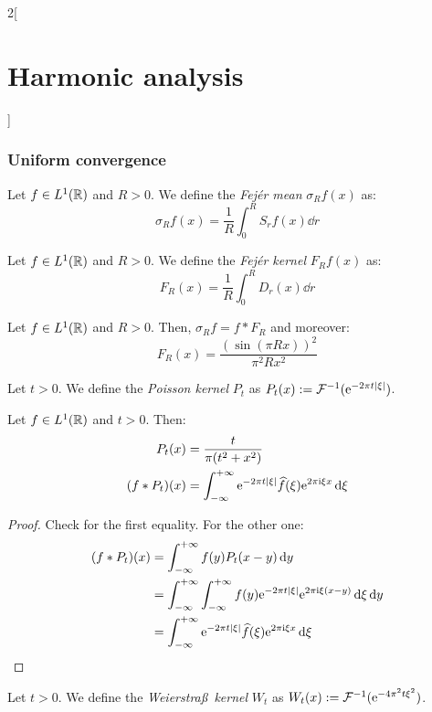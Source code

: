 \documentclass[../../../main_math.tex]{subfiles}
\begin{document}
\begin{multicols}{2}[\section{Harmonic analysis}]
  \subsubsection{Uniform convergence}
  \begin{definition}
    Let $f\in L^1(\mathbb{R})$ and $R>0$. We define the \emph{Fejér mean} $\sigma_Rf(x)$ as: $$\sigma_Rf(x)=\frac{1}{R}\int_{0}^RS_rf(x)\dd{r}$$
  \end{definition}
  \begin{definition}
    Let $f\in L^1(\mathbb{R})$ and $R>0$. We define the \emph{Fejér kernel} $F_Rf(x)$ as: $$F_R(x)=\frac{1}{R}\int_{0}^RD_r(x)\dd{r}$$
  \end{definition}
  \begin{lemma}
    Let $f\in L^1(\mathbb{R})$ and $R>0$. Then, $\sigma_Rf=f*F_R$ and moreover:
    $$F_R(x)=\frac{{\left(\sin\left(\pi R x\right)\right)}^2}{\pi^2 R x^2}$$
  \end{lemma}
  \begin{definition}
    Let $t>0$. We define the \emph{Poisson kernel} $P_t$ as $P_t(x):=\mathcal{F}^{-1}(\mathrm{e}^{-2\pi t\abs{\xi}})$.
  \end{definition}
  \begin{lemma}
    Let $f\in L^1(\mathbb{R})$ and $t>0$. Then:
    \begin{align*}
      P_t(x)     & =\frac{t}{\pi(t^2+x^2)}                                                                   \\
      (f*P_t)(x) & =\int_{-\infty}^{+\infty}\mathrm{e}^{-2\pi t\abs{\xi}}\widehat{f}(\xi)\mathrm{e}^{2\pi\mathrm{i}\xi x}\dd{\xi}
    \end{align*}
  \end{lemma}
  \begin{proof}
    Check  for the first equality. For the other one:
    \begin{align*}
      (f*P_t)(x) & =\int_{-\infty}^{+\infty}f(y)P_t(x-y)\dd{y}                                                                      \\
                 & =\int_{-\infty}^{+\infty}\int_{-\infty}^{+\infty}f(y)\mathrm{e}^{-2\pi t\abs{\xi}}\mathrm{e}^{2\pi\mathrm{i} \xi (x-y)}\dd{\xi}\dd{y} \\
                 & =\int_{-\infty}^{+\infty}\mathrm{e}^{-2\pi t\abs{\xi}}\widehat{f}(\xi)\mathrm{e}^{2\pi\mathrm{i}\xi x}\dd{\xi}
    \end{align*}
  \end{proof}
  \begin{definition}
    Let $t>0$. We define the \emph{Weierstra\ss\ kernel} $W_t$ as $W_t(x):=\mathcal{F}^{-1}(\mathrm{e}^{-4\pi^2 t\xi^2})$.

\end{definition}
\end{multicols}
\end{document}
